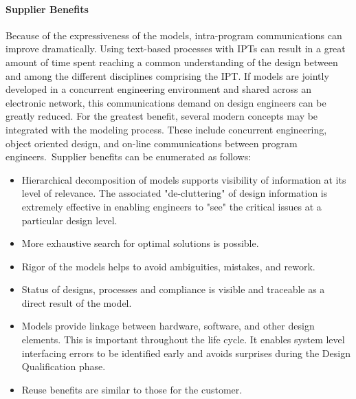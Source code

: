 \documentclass[a4paper,12pt,twoside]{report}
\begin{document}
{			\paragraph{Supplier Benefits} {Because of the expressiveness of the models, intra-program communications can improve dramatically. Using text-based processes with IPTs can result in a great amount of time spent reaching a common understanding of the design between and among the different disciplines comprising the IPT. If models are jointly developed in a concurrent engineering environment and shared across an electronic network, this communications demand on design engineers can be greatly reduced. For the greatest benefit, several modern concepts may be integrated with the modeling process. These include concurrent engineering, object oriented design, and on-line communications between program engineers.\ Supplier benefits can be enumerated as follows: \cite{FoundationalConceptsMDSD}
			}
			\begin{itemize}
				\item Hierarchical decomposition of models supports visibility of information at its level of relevance. The associated "de-cluttering" of design information is extremely effective in enabling engineers to "see" the critical issues at a particular design level.
				\item More exhaustive search for optimal solutions is possible.
				\item Rigor of the models helps to avoid ambiguities, mistakes, and rework.
				\item Status of designs, processes and compliance is visible and traceable as a direct result of the model.
				\item Models provide linkage between hardware, software, and other design elements. This is important throughout the life cycle. It enables system level interfacing errors to be identified early and avoids surprises during the Design Qualification phase.
				\item Reuse benefits are similar to those for the customer.
			\end{itemize}
			
}
\end{document}
